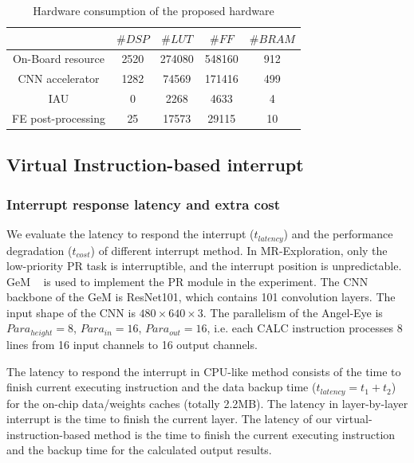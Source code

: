 \begin{table}[t]
  \centering
  \caption{Hardware consumption of the proposed hardware}
\begin{tabular}{|c|c|c|c|c|}
  \hline
        & $\# DSP$ & $\# LUT$ & $\# FF$ & $\# BRAM$ \\
  \hline
  On-Board resource &   2520   &  274080      &  548160     & 912 \\
  \hline
  CNN accelerator &   1282   &  74569      &   171416    & 499 \\
  \hline
  IAU &   0   &  2268      &   4633    & 4 \\
  \hline
  FE post-processing & 25      &  17573     &   29115    & 10 \\
  \hline
  \end{tabular}%
  
  \label{tab:hardware}%
\end{table}%


\subsection{Virtual Instruction-based interrupt }

\subsubsection{ Interrupt response latency and extra cost}


We evaluate the latency to respond the interrupt ($t_{latency}$) and the performance degradation ($t_{cost}$) of different interrupt method. In MR-Exploration, only the low-priority PR task is interruptible, and the interrupt position is unpredictable. GeM  ~\cite{radenovic2018fine} is used to implement the PR module in the experiment.
The CNN backbone of the GeM is ResNet101, which contains 101 convolution layers. The input shape of the CNN is $480 \times 640 \times 3$. The parallelism of the Angel-Eye is $Para_{height}=8$, $Para_{in}=16$, $Para_{out}=16$, i.e. each CALC instruction processes 8 lines from 16 input channels to 16 output channels. 

The latency to respond the interrupt in CPU-like method consists of the time to finish current executing instruction and the data backup time ($t_{latency} = t_1+t_2$) for the on-chip data/weights caches (totally 2.2MB). The latency in layer-by-layer interrupt is the time to finish the current layer. The latency of our virtual-instruction-based method is the time to finish the current executing instruction and the backup time for the calculated output results. 

